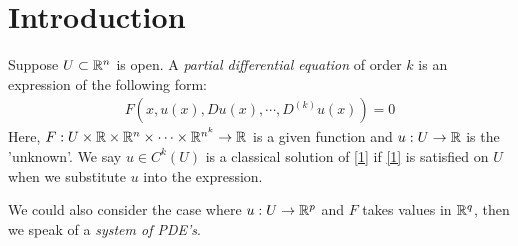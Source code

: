 \documentclass[10pt,a4paper]{report}
\begin{document}
\section*{Introduction}

Suppose $U \subset \mathbb{R}^n$ is open. A \emph{partial differential equation} of order $k$ is an expression of the following form:
\begin{align}
F(x, u(x),Du(x),\cdots,D^{(k)}u(x))=0 \label{1}
\end{align}
Here, $F: U \times \mathbb{R}\times \mathbb{R}^n \times \cdots \times \mathbb{R}^{n^k} \rightarrow \mathbb{R}$ is a given function and $u : U \rightarrow \mathbb{R}$ is the 'unknown'. We say $u\in C^k(U)$ is a classical solution of \ref{1} if \ref{1} is satisfied on $U$ when we substitute $u$ into the expression.
\s

We could also consider the case where $u:U \rightarrow \mathbb{R}^p$ and $F$ takes values in $\mathbb{R}^q$, then we speak of a \emph{system of PDE's}.
\s
\end{document}
